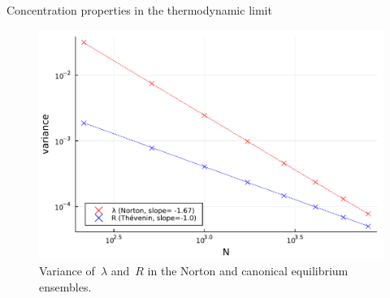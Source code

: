 \begin{subsection}{Concentration properties in the thermodynamic limit}
    \begin{figure}
        \centering
        \includegraphics[width=0.8\linewidth]{figures/04/histogram_variances.pdf}
        \caption[]{Variance of~$\lambda$ and~$R$ in the Norton and canonical equilibrium ensembles.}
        \label{04:fig:eq_vars}
    \end{figure}
    \end{subsection}


